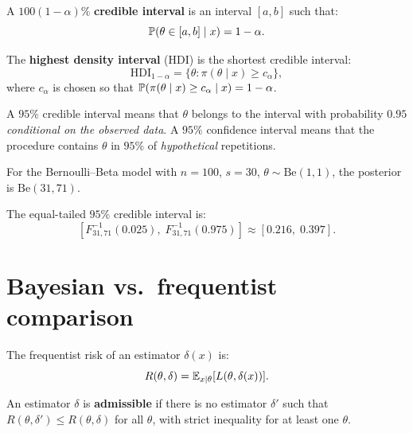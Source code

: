 \begin{definition}
A $100(1-\alpha)\%$ \textbf{credible interval} is an interval $[a, b]$
such that:
\[
  \mathbb{P}(\theta \in [a, b] \mid x) = 1 - \alpha.
\]
\end{definition}

\begin{definition}
The \textbf{highest density interval} (HDI) is the shortest credible
interval:
\[
  \text{HDI}_{1-\alpha} = \{
  \theta : \pi(\theta \mid x) \geq c_\alpha\},
\]
where $c_\alpha$ is chosen so that
$\mathbb{P}(\pi(\theta \mid x) \geq c_\alpha \mid x) = 1 - \alpha$.
\end{definition}

\begin{warning}[title=\textbf{Credible vs.\ confidence}]
A $95\%$ credible interval means that $\theta$ belongs to the interval
with probability $0.95$ \textit{conditional on the observed data}. A
$95\%$ confidence interval means that the procedure contains $\theta$
in $95\%$ of \textit{hypothetical} repetitions.
\end{warning}

\begin{example}
For the Bernoulli--Beta model with $n = 100$, $s = 30$,
$\theta \sim \text{Be}(1,1)$, the posterior is $\text{Be}(31, 71)$.

The equal-tailed $95\%$ credible interval is:
\[
  [F^{-1}_{31,71}(0.025),\; F^{-1}_{31,71}(0.975)]
  \approx [0.216,\; 0.397].
\]
\end{example}

\section{Bayesian vs.\ frequentist comparison}

\begin{definition}
The frequentist risk of an estimator $\delta(x)$ is:
\[
  R(\theta, \delta) = \mathbb{E}_{x \mid \theta}[L(\theta, \delta(x))].
\]
\end{definition}

\begin{definition}[Admissibility]
An estimator $\delta$ is \textbf{admissible} if there is no estimator
$\delta'$ such that $R(\theta, \delta') \leq R(\theta, \delta)$ for
all $\theta$, with strict inequality for at least one $\theta$.
\end{definition}

